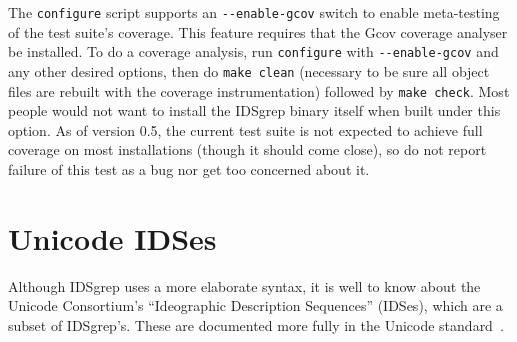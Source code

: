 \documentclass[twocolumn]{report}
\newcommand{\DangerousBend}{\marginpar{\large\hfill\dbend\hfill\null}}
\begin{document}
The \DangerousBend\texttt{configure} script supports an
\texttt{-{}-enable-gcov} switch to enable meta-testing of the test suite's
coverage.  This feature requires that the Gcov coverage analyser be
installed.  To do a coverage analysis, run \texttt{configure} with
\texttt{-{}-enable-gcov} and any other desired options, then do \texttt{make
clean} (necessary to be sure all object files are rebuilt with the coverage
instrumentation) followed by \texttt{make check}.  Most people would not
want to install the IDSgrep binary itself when built under this option.  As
of version 0.5, the current test suite is not expected to achieve full
coverage on most installations (though it should come close), so do not
report failure of this test as a bug nor get too concerned about it.


\section{Unicode IDSes}

Although IDSgrep uses a more elaborate syntax, it is well to know
about the Unicode Consortium's ``Ideographic Description Sequences''
(IDSes), which are a subset of IDSgrep's.  These are documented
more fully in the Unicode standard~\cite{Unicode:IDS}.
\end{document}
